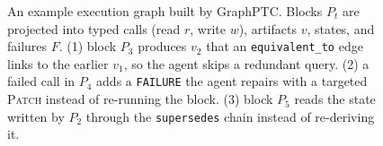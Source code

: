 \begin{figure}[t]
\caption{An example execution graph built by GraphPTC. Blocks $P_t$ are projected into typed calls (read $r$, write $w$), artifacts $v$, states, and failures $F$. (1) block $P_3$ produces $v_2$ that an \texttt{equivalent\_to} edge links to the earlier $v_1$, so the agent skips a redundant query. (2) a failed call in $P_4$ adds a \texttt{FAILURE} the agent repairs with a targeted \textsc{Patch} instead of re-running the block. (3) block $P_5$ reads the state written by $P_2$ through the \texttt{supersedes} chain instead of re-deriving it.}
\label{fig:casegraph}
\end{figure}
